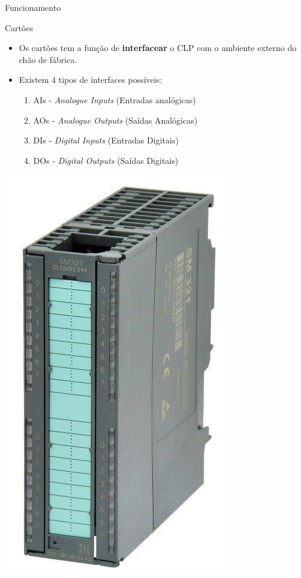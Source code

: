 \begin{frame}{Funcionamento}
	\begin{block}{Cartões}
		\begin{itemize}
			\item Os cartões tem a função de \textbf{interfacear} o CLP com o ambiente externo do chão de fábrica.
			\item Existem 4 tipos de interfaces possíveis:
			\begin{enumerate}
				\item AIs - \textit{Analogue Inputs} (Entradas analógicas)
				\item AOs - \textit{Analogue Outputs} (Saídas Analógicas)
				\item DIs - \textit{Digital Inputs} (Entradas Digitais)
				\item DOs - \textit{Digital Outputs} (Saídas Digitais)
			\end{enumerate}
		\end{itemize}
	\end{block}

	\centering
	
	\includegraphics[height=0.4\textheight]{Figuras/Ch09/fig2}
\end{frame}


